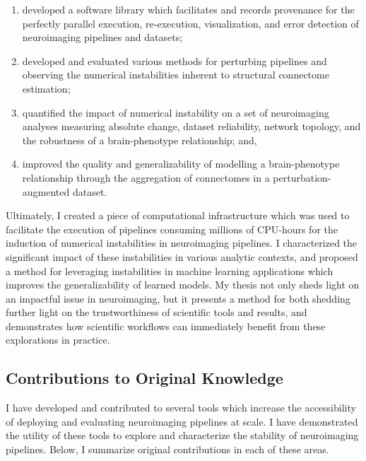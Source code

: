 \begin{enumerate}[label=(\roman*)]
\item developed a software library which facilitates and records provenance for the perfectly parallel execution,
re-execution, visualization, and error detection of neuroimaging pipelines and datasets;
\item developed and evaluated various methods for perturbing pipelines and observing the numerical instabilities
inherent to structural connectome estimation;
\item quantified the impact of numerical instability on a set of neuroimaging analyses measuring absolute change,
dataset reliability, network topology, and the robustness of a brain-phenotype relationship; and,
\item improved the quality and generalizability of modelling a brain-phenotype relationship through the aggregation of
connectomes in a perturbation-augmented dataset.
\end{enumerate}

Ultimately, I created a piece of computational infrastructure which was used to facilitate the execution of pipelines
consuming millions of CPU-hours for the induction of numerical instabilities in neuroimaging pipelines. I characterized
the significant impact of these instabilities in various analytic contexts, and proposed a method for leveraging
instabilities in machine learning applications which improves the generalizability of learned models. My thesis not
only sheds light on an impactful issue in neuroimaging, but it presents a method for both shedding further light on
the trustworthiness of scientific tools and results, and demonstrates how scientific workflows can immediately benefit
from these explorations in practice.

\subsection{Contributions to Original Knowledge}
I have developed and contributed to several tools which increase the accessibility of deploying and evaluating
neuroimaging pipelines at scale. I have demonstrated the utility of these tools to explore and characterize the
stability of neuroimaging pipelines. Below, I summarize original contributions in each of these areas.

